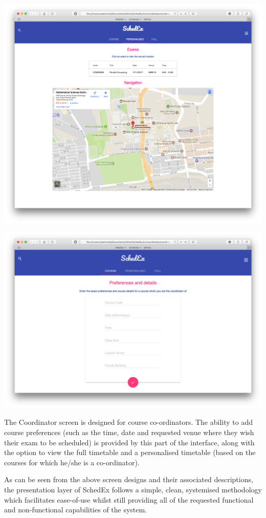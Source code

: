 \documentclass{article}
\begin{document}
\centerline{\includegraphics[scale=0.4]{coordinator_personalised}}


\centerline{\includegraphics[scale=0.4]{coordinator_course}}


The Coordinator screen is designed for course co-ordinators. The ability to add course preferences (such as the time, date and requested venue where they wish their exam to be scheduled) is provided by this part of the interface, along with the option to view the full timetable and a personalised timetable (based on the courses for which he/she is a co-ordinator).

As can be seen from the above screen designs and their associated descriptions, the presentation layer of SchedEx follows a simple, clean, systemised methodology which facilitates ease-of-use whilst still providing all of the requested functional and non-functional capabilities of the system.
\end{document}

